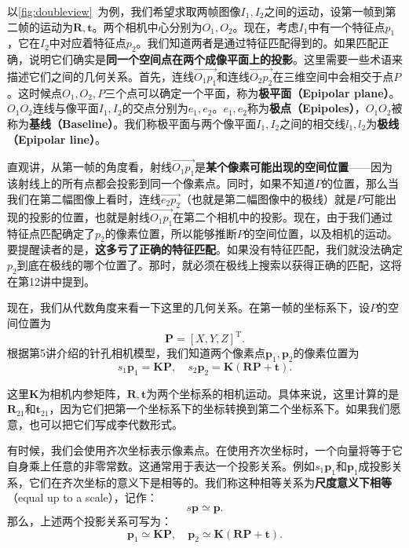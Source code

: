 以\autoref{fig:doubleview}~为例，我们希望求取两帧图像$I_{1}, I_{2}$之间的运动，设第一帧到第二帧的运动为$\bm{R}, \bm{t}$。两个相机中心分别为$O_{1}, O_{2}$。现在，考虑$I_{1}$中有一个特征点$p_{1}$，它在$I_{2}$中对应着特征点$p_{2}$。我们知道两者是通过特征匹配得到的。如果匹配正确，说明它们确实是\textbf{同一个空间点在两个成像平面上的投影}。这里需要一些术语来描述它们之间的几何关系。首先，连线$\overrightarrow{O_{1}p_{1}}$和连线$\overrightarrow{O_{2}p_{2}}$在三维空间中会相交于点$P$。这时候点$O_{1},O_{2},P$三个点可以确定一个平面，称为\textbf{极平面（Epipolar plane）}。$O_{1}O_{2}$连线与像平面$I_{1},I_{2}$的交点分别为$e_{1},e_{2}$。$e_{1},e_{2}$称为\textbf{极点（Epipoles）}，$O_{1}O_{2}$被称为\textbf{基线（Baseline）}。我们称极平面与两个像平面$I_{1}, I_{2}$之间的相交线$l_{1},l_{2}$为\textbf{极线（Epipolar line）}。

直观讲，从第一帧的角度看，射线$\overrightarrow{O_1 p_1}$是\textbf{某个像素可能出现的空间位置}——因为该射线上的所有点都会投影到同一个像素点。同时，如果不知道$P$的位置，那么当我们在第二幅图像上看时，连线$\overrightarrow{e_2 p_2}$（也就是第二幅图像中的极线）就是$P$可能出现的投影的位置，也就是射线$\overrightarrow{O_1 p_1}$在第二个相机中的投影。现在，由于我们通过特征点匹配确定了$p_2$的像素位置，所以能够推断$P$的空间位置，以及相机的运动。要提醒读者的是，\textbf{这多亏了正确的特征匹配}。如果没有特征匹配，我们就没法确定$p_2$到底在极线的哪个位置了。那时，就必须在极线上搜索以获得正确的匹配，这将在第12讲中提到。

现在，我们从代数角度来看一下这里的几何关系。在第一帧的坐标系下，设$P$的空间位置为
\[
\bm{P}=[X,Y,Z]^\mathrm{T}.
\]
根据第5讲介绍的针孔相机模型，我们知道两个像素点$\bm{p}_1,\bm{p}_2$的像素位置为
\begin{equation}
s_1 {\bm{p}_1} = \bm{KP},\quad s_2 \bm{p}_2 = \bm{K}\left( \bm{RP + t} \right).
\end{equation}

这里$\bm{K}$为相机内参矩阵，$\bm{R}, \bm{t}$为两个坐标系的相机运动。具体来说，这里计算的是$\bm{R}_{21}$和$\bm{t}_{21}$，因为它们把第一个坐标系下的坐标转换到第二个坐标系下。如果我们愿意，也可以把它们写成李代数形式。

有时候，我们会使用齐次坐标表示像素点。在使用齐次坐标时，一个向量将等于它自身乘上任意的非零常数。这通常用于表达一个投影关系。例如$s_1 \bm{p}_1$和$\bm{p}_1$成投影关系，它们在齐次坐标的意义下是相等的。我们称这种相等关系为\textbf{尺度意义下相等}（equal up to a scale），记作：
\begin{equation}
s\bm{p} \simeq \bm{p}.
\end{equation}
那么，上述两个投影关系可写为：
\begin{equation}
 {\bm{p}_1} \simeq \bm{KP},\quad \bm{p}_2 \simeq \bm{K}\left( \bm{RP + t} \right).
\end{equation}


